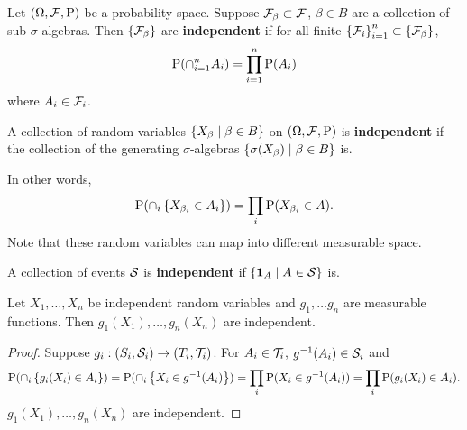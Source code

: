 \begin{definition}
    Let $(\Omega,\F,\P)$ be a probability space. Suppose $\F_\beta\subset\F$, 
    $\beta\in B$ are a collection of sub-$\sigma$-algebras. Then $\set{\F_\beta}$ 
    are \textbf{independent} if for all finite $\set{\F_i}_{i=1}^n\subset\set{\F_\beta}$, 
    \begin{equation*}
        \P(\cap_{i=1}^n A_i) = \prod_{i=1}^{n}\P(A_i) 
    \end{equation*}
    where $A_i\in\F_i$. 
\end{definition}

\begin{definition}
    A collection of random variables $\Set{X_\beta}{\beta\in B}$ on $(\Omega,\F,\P)$ 
    is \textbf{independent} if the collection of the generating $\sigma$-algebras 
    $\Set{\sigma(X_\beta)}{\beta\in B}$ is. 
\end{definition}
\begin{remark}
    In other words, 
    \begin{equation*}
        \P(\cap_i \set{X_{\beta_i}\in A_i}) = \prod_i \P(X_{\beta_i}\in A). 
    \end{equation*}
    Note that these random variables can map into different measurable space. 
\end{remark}

\begin{definition}
    A collection of events $\S$ is \textbf{independent} if $\Set{\one_A}{A\in\S}$ is. 
\end{definition}

\begin{proposition}
    Let $X_1,\dots,X_n$ be independent random variables and $g_1,\ldots g_n$ 
    are measurable functions. Then $g_1(X_1),\ldots,g_n(X_n)$ are independent. 
\end{proposition}
\begin{proof}
    Suppose $g_i:(S_i,\S_i)\to (T_i,\T_i)$. For $A_i\in\T_i$, $g^{-1}(A_i)\in\S_i$ 
    and 
    \begin{equation*}
        \P(\cap_i \set{g_i(X_i)\in A_i}) = \P(\cap_i \set{X_i\in g^{-1}(A_i)}) 
        = \prod_i \P(X_i\in g^{-1}(A_i)) = \prod_i \P(g_i(X_i)\in A_i).
    \end{equation*}
    $g_1(X_1),\ldots,g_n(X_n)$ are independent. 
\end{proof}

